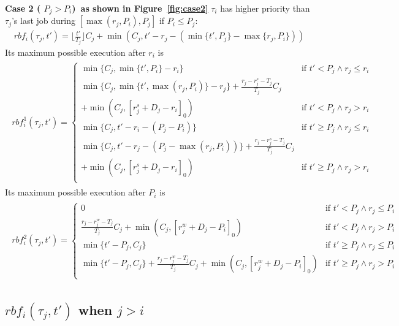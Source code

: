 \documentclass[12pt,conference,onecolumn]{IEEEtran}
\begin{document}
\textbf{Case 2 ( $P_j> P_i$)~as shown in  Figure~\ref{fig:case2}} $\tau_i$ has higher priority than $\tau_j$'s last job during $[\max(r_j,P_i),P_j]$ if $P_i\leq P_j$:
	\begin{align*}
		rbf_i(\tau_j,t')=\lfloor \frac{t'}{T_j} \rfloor C_j +\min\left(C_j,t'-r_j-\left(\min\{t',P_j\}-\max\{r_j,P_i\}\right)\right)
	\end{align*}
Its maximum possible execution after $r_i$ is
\begin{align*}
\begin{split}
rbf_{i}^1(\tau_j,t')=
\begin{cases}
\min\{C_j,\min\{t',P_i\}-r_i\}&\mbox{if } t'<P_j\wedge r_j\leq r_i\\
\min\{C_j,\min\{t',\max(r_j,P_i)\}-r_j\} +\frac{r_j-r_j^s-T_j}{T_j}C_j &	\\+\min(C_j,[r_j^s+D_j-r_i]_0)&\mbox{if } t'<P_j\wedge r_j> r_i\\
\min\{C_j,t'-r_i-(P_j-P_i)\}&\mbox{if } t'\geq P_j\wedge r_j\leq r_i\\
\min\{C_j,t'-r_j-(P_j-\max(r_j,P_i))\}+\frac{r_j-r_j^s-T_j}{T_j}C_j&\\ +\min(C_j,[r_j^s+D_j-r_i]_0)&\mbox{if } t'\geq P_j\wedge r_j> r_i\\
\end{cases}
\end{split}
\end{align*}
Its maximum possible execution after $P_i$ is
\begin{align*}
\begin{split}
rbf_{i}^2(\tau_j,t')=
\begin{cases}
0&\mbox{if } t'<P_j \wedge r_j\leq P_i\\
\frac{r_j-r_j^w-T_j}{T_j}C_j+\min(C_j,[r_j^w+D_j-P_i]_0)&\mbox{if } t'<P_j \wedge r_j> P_i\\
\min\{t'-P_j,C_j\}&\mbox{if } t'\geq P_j \wedge  r_j\leq P_i\\
\min\{t'-P_j,C_j\}+\frac{r_j-r_j^w-T_j}{T_j}C_j+\min(C_j,[r_j^w+D_j-P_i]_0)&\mbox{if } t'\geq P_j \wedge  r_j> P_i\\
\end{cases}
\end{split}
\end{align*}






\subsection{$rbf_i(\tau_j,t')$ when $j> i$}
 
\end{document}
